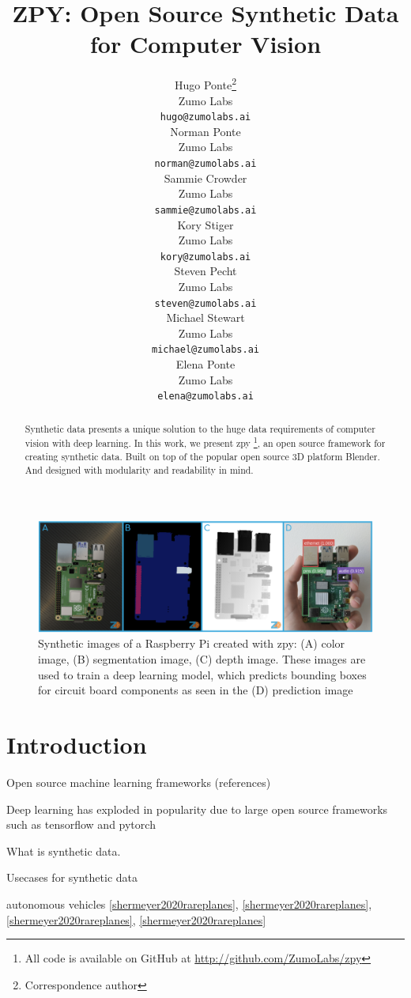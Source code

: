 \documentclass{article}
\title{ZPY: Open Source Synthetic Data for Computer Vision}
\author{
	{\hspace{1mm}Hugo Ponte}\footnote{Correspondence author} \\ 
	Zumo Labs \\
	\texttt{hugo@zumolabs.ai} \\
	\And
	{\hspace{1mm}Norman Ponte} \\
	Zumo Labs \\
	\texttt{norman@zumolabs.ai} \\
	\And
	{\hspace{1mm}Sammie Crowder} \\
	Zumo Labs \\
	\texttt{sammie@zumolabs.ai} \\
	\And
	{\hspace{1mm}Kory Stiger} \\
	Zumo Labs \\
	\texttt{kory@zumolabs.ai} \\
	\And
	{\hspace{1mm}Steven Pecht} \\
	Zumo Labs \\
	\texttt{steven@zumolabs.ai} \\
	\And
	{\hspace{1mm}Michael Stewart} \\
	Zumo Labs \\
	\texttt{michael@zumolabs.ai} \\
	\And
	{\hspace{1mm}Elena Ponte} \\
	Zumo Labs \\
	\texttt{elena@zumolabs.ai} \\
}
\date{}
\begin{document}
\maketitle

\begin{abstract}
Synthetic data presents a unique solution to the huge data requirements of computer vision with deep learning. In this work, we present zpy \footnote{All code is available on GitHub at \url{http://github.com/ZumoLabs/zpy}}, an open source framework for creating synthetic data. Built on top of the popular open source 3D platform Blender. And designed with modularity and readability in mind.
\end{abstract}


\begin{figure}[!ht]
	\centering
	\includegraphics[width=\textwidth]{cover.png}
	\caption{Synthetic images of a Raspberry Pi created with zpy: (A) color image, (B) segmentation image, (C) depth image. These images are used to train a deep learning model, which predicts bounding boxes for circuit board components as seen in the (D) prediction image}
	\label{fig:fig1}
\end{figure}

\section{Introduction}
\label{sec:introduction}

Open source machine learning frameworks (references)

Deep learning has exploded in popularity due to large open source frameworks such as tensorflow and pytorch

What is synthetic data.

Usecases for synthetic data

autonomous vehicles \ref{shermeyer2020rareplanes}, \ref{shermeyer2020rareplanes}, \ref{shermeyer2020rareplanes}, \ref{shermeyer2020rareplanes}
\end{document}
